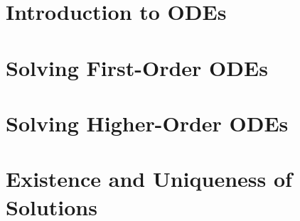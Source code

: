 \documentclass{report}
\begin{document}
	
	\thispagestyle{empty}
	\newpage%
	\tableofcontents
  
  \chapter{Introduction to ODEs}
  
  \chapter{Solving First-Order ODEs}
  
  \chapter{Solving Higher-Order ODEs}
  
  \chapter{Existence and Uniqueness of Solutions}
  
  
\end{document}
